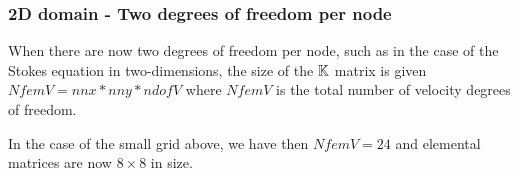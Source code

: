 \subsubsection{2D domain - Two degrees of freedom per node}

When there are now two degrees of freedom per node, such as in the case of the Stokes equation
in two-dimensions, the size of the ${\mathbb{K}}$ matrix is given $NfemV=nnx*nny*ndofV$  
where $NfemV$ is the total number of velocity degrees of freedom.

\begin{center}

\end{center}

In the case of the small grid above, we have then $NfemV=24$ and
elemental matrices are now $8\times8$ in size.

